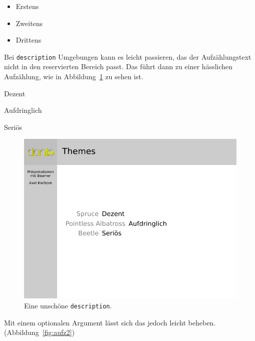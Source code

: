 \begin{lfgwcode}{}
\begin{itemize}[<+->]
  \item Erstens
  \item Zweitens
  \item Drittens
\end{itemize}
\end{lfgwcode}

Bei \texttt{description} Umgebungen kann es leicht passieren, das der
Aufzählungstext nicht in den reservierten Bereich passt. Das führt dann zu
einer hässlichen Aufzählung, wie in Abbildung~\ref{fig:aufz1} zu sehen ist.

\begin{lfgwcode}{}
\begin{description}[<*>]
  \item[Spruce]
    Dezent
  \item[Pointless Albatross]
    Aufdringlich
  \item[Beetle]
    Seriös
\end{description}
\end{lfgwcode}

\begin{figure}
  \includegraphics[width=\textwidth]{beamer-aufz1}
  \caption{Eine unschöne \texttt{description}.}
  \label{fig:aufz1}
\end{figure}

Mit einem optionalen Argument lässt sich das jedoch leicht beheben. (Abbildung~\ref{fig:aufz2})

